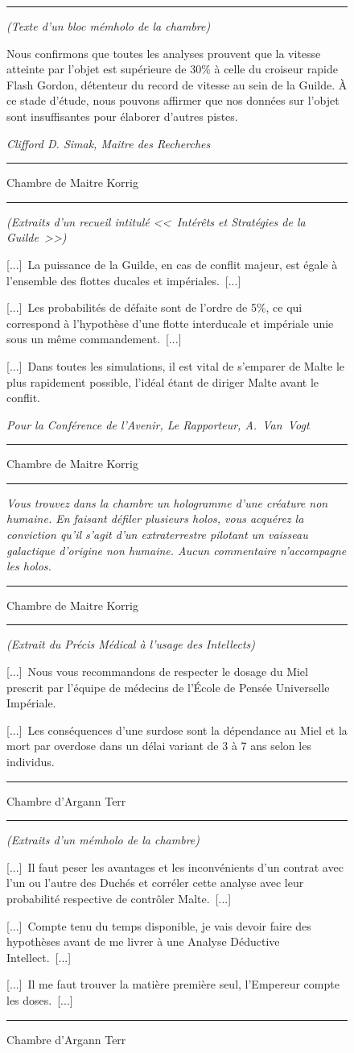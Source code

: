 \documentclass{article}
\newcommand{\newcharacter}{\clearpage\setcounter{figure}{0}}
\newcommand{\indice}[4]{
    \begin{figure}[H]
        \begin{center}
            \rule{0.5\textwidth}{1pt}
        \end{center}
        \begin{framed}
            \begin{samepage}
                \textit{#1}
                \nopagebreak

                #2

                \nopagebreak

                \hfill\textit{#3}
            \end{samepage}
        \end{framed}
        \caption{#4}
        \begin{center}
            \rule{0.5\textwidth}{1pt}
        \end{center}
    \end{figure}
}
\begin{document}
\newcharacter

\indice
{(Texte d'un bloc mémholo de la chambre)}
{Nous confirmons que toutes les analyses prouvent que la vitesse atteinte par
l'objet est supérieure de 30\% à celle du croiseur rapide Flash Gordon,
détenteur du record de vitesse au sein de la Guilde. À ce stade d'étude, nous
pouvons affirmer que nos données sur l'objet sont insuffisantes pour élaborer
d'autres pistes.}
{Clifford D. Simak, Maitre des Recherches}
{Chambre de Maitre Korrig}

\indice
{(Extraits d'un recueil intitulé <<~Intérêts et Stratégies de la Guilde~>>)}
{[...]~La puissance de la Guilde, en cas de conflit majeur, est égale à
l'ensemble des flottes ducales et impériales.~[...]

\nobreak

[...]~Les probabilités de défaite sont de l'ordre de 5\%, ce qui correspond à
l'hypothèse d'une flotte interducale et impériale unie sous un même
commandement.~[...]

\nobreak

[...]~Dans toutes les simulations, il est vital de s'emparer de Malte le plus
rapidement possible, l'idéal étant de diriger Malte avant le conflit.}
{Pour la Conférence de l'Avenir, Le Rapporteur, A.~Van~Vogt}
{Chambre de Maitre Korrig}

\indice
{Vous trouvez dans la chambre un hologramme d'une créature non humaine. En
faisant défiler plusieurs holos, vous acquérez la conviction qu'il s'agit d'un
extraterrestre pilotant un vaisseau galactique d'origine non humaine. Aucun
commentaire n'accompagne les holos.}
{}
{}
{Chambre de Maitre Korrig}

\newcharacter

\indice
{(Extrait du Précis Médical à l'usage des Intellects)}
{[...]~Nous vous recommandons de respecter le dosage du Miel prescrit par
l'équipe de médecins de l'École de Pensée Universelle Impériale.

\nobreak

[...]~Les conséquences d'une surdose sont la dépendance au Miel et la mort par
overdose dans un délai variant de 3 à 7 ans selon les individus.}
{}
{Chambre d'Argann Terr}

\indice
{(Extraits d'un mémholo de la chambre)}
{[...]~Il faut peser les avantages et les inconvénients d'un contrat avec l'un
ou l'autre des Duchés et corréler cette analyse avec leur probabilité
respective de contrôler Malte.~[...]

\nobreak

[...]~Compte tenu du temps disponible, je vais devoir faire des hypothèses
avant de me livrer à une Analyse Déductive Intellect.~[...]

\nobreak

[...]~Il me faut trouver la matière première seul, l'Empereur compte les
doses.~[...]}
{}
{Chambre d'Argann Terr}
\end{document}
